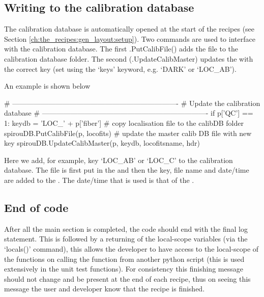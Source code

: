 \clearpage
\newpage
\subsection{Writing to the calibration database}
\label{ch:the_recipes:gen_layout:writing_calibdb}

The calibration database is automatically opened at the start of the recipes (see Section \ref{ch:the_recipes:gen_layout:setup}). Two commands are used to interface with the calibration database. The first \spirouCDB.PutCalibFile() adds the file to the calibration database folder. The second (\spirouCDB.UpdateCalibMaster) updates the \masterCALIBDBfile with the correct key (set using the `keys' keyword, e.g. `DARK' or `LOC\_AB').


\vspace{0.5cm}
\begin{minipage}{\textwidth}
\noindent An example is shown below
\begin{pythonbox}
# ----------------------------------------------------------------------
# Update the calibration database
# ----------------------------------------------------------------------
if p['QC'] == 1:
    keydb = 'LOC_' + p['fiber']
    # copy localisation file to the calibDB folder
    spirouDB.PutCalibFile(p, locofits)
    # update the master calib DB file with new key
    spirouDB.UpdateCalibMaster(p, keydb, locofitsname, hdr)
\end{pythonbox}
\begin{note}
Here we add, for example, key `LOC\_AB' or `LOC\_C' to the calibration database. The file is first put in the  and then the key, file name and date/time are added to the \masterCALIBDBfile. The date/time that is used is that of the .
\end{note}
\end{minipage}

\subsection{End of code}
\label{ch:the_recipes:gen_layout:end}

After all the main section is completed, the code should end with the final log statement. This is followed by a returning of the local-scope variables (via the `locals()' command), this allows the developer to have access to the local-scope of the functions on calling the function from another python script (this is used extensively in the unit test functions). For consistency this finishing message should not change and be present at the end of each recipe, thus on seeing this message the user and developer know that the recipe is finished.

